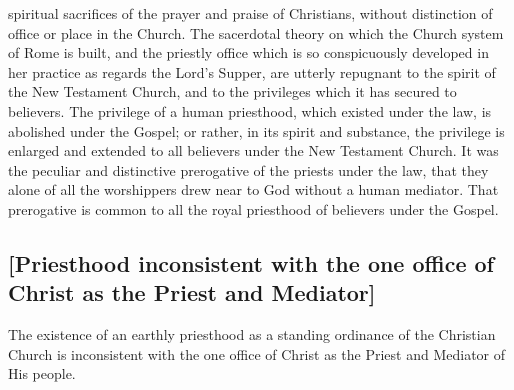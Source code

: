 \documentclass[
]{book}
\begin{document}
spiritual sacrifices of the prayer and praise of Christians, without distinction of office or place in the Church. The sacerdotal theory on which the Church system of Rome is built, and the priestly office which is so conspicuously developed in her practice as regards the Lord's Supper, are utterly repugnant to the spirit of the New Testament Church, and to the privileges which it has secured to believers. The privilege of a human priesthood, which existed under the law, is abolished under the Gospel; or rather, in its spirit and substance, the privilege is enlarged and extended to all believers under the New Testament Church. It was the peculiar and distinctive prerogative of the priests under the law, that they alone of all the worshippers drew near to God without a human mediator. That prerogative is common to all the royal priesthood of believers under the Gospel.

\hypertarget{priesthood-inconsistent-with-the-one-office-of-christ-as-the-priest-and-mediator}{%
\subsection{{[}Priesthood inconsistent with the one office of Christ as the Priest and Mediator{]}}\label{priesthood-inconsistent-with-the-one-office-of-christ-as-the-priest-and-mediator}}

The existence of an earthly priesthood as a standing ordinance of the Christian Church is inconsistent with the one office of Christ as the Priest and Mediator of His people.
\end{document}
